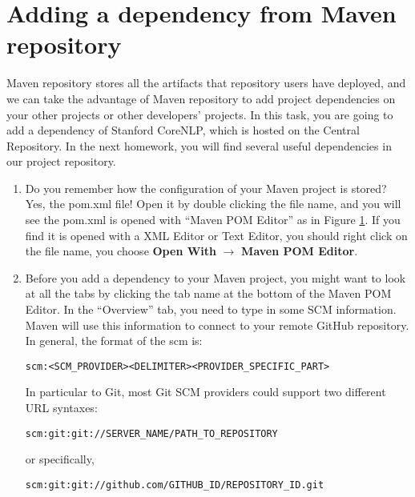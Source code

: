 \section{Adding a dependency from Maven repository}

Maven repository stores all the artifacts that repository users have deployed, and we can take the advantage of Maven repository to add project dependencies on your other projects or other developers' projects. In this task, you are going to add a dependency of Stanford CoreNLP, which is hosted on the Central Repository. In the next homework, you will find several useful dependencies in our project repository.

\begin{enumerate}
 
\begin{figure}[t]
\centering
\texttt{[image: repo-01-pom]}
\caption{Opening a POM file\label{repo-01-pom}}
\end{figure}

\item Do you remember how the configuration of your Maven project is stored? Yes, the pom.xml file! Open it by double clicking the file name, and you will see the pom.xml is opened with ``Maven POM Editor'' as in Figure \ref{repo-01-pom}. If you find it is opened with a XML Editor or Text Editor, you should right click on the file name, you choose \textbf{Open With} $\rightarrow$ \textbf{Maven POM Editor}.
\item Before you add a dependency to your Maven project, you might want to look at all the tabs by clicking the tab name at the bottom of the Maven POM Editor. In the ``Overview'' tab, you need to type in some SCM information. Maven will use this information to connect to your remote GitHub repository. In general, the format of the scm is:

\begin{verbatim}
scm:<SCM_PROVIDER><DELIMITER><PROVIDER_SPECIFIC_PART>
\end{verbatim}

In particular to Git, most Git SCM providers could support two different URL syntaxes:

\begin{verbatim}
scm:git:git://SERVER_NAME/PATH_TO_REPOSITORY
\end{verbatim}

or specifically, 

\begin{verbatim}
scm:git:git://github.com/GITHUB_ID/REPOSITORY_ID.git
\end{verbatim}


\end{enumerate}

